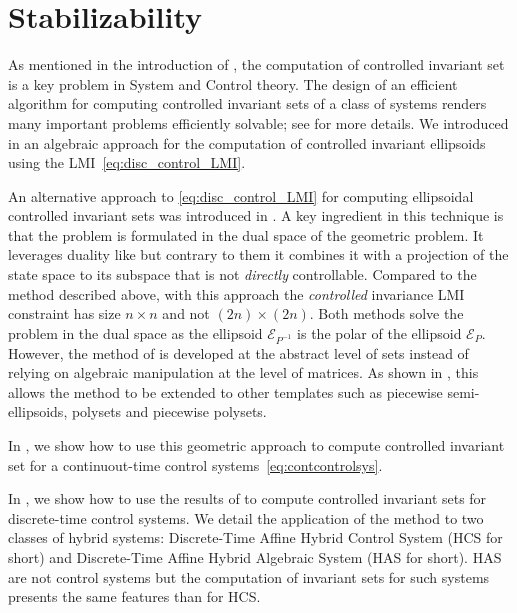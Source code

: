 \documentclass[11pt,twoside,a4paper,openright]{uclouvain-thesis}
\newcommand{\dtahcs}{HCS}
\newcommand{\dtahas}{HAS}
\begin{document}
\chapter{Stabilizability}
\label{chap:mci}

As mentioned in the introduction of ,
the computation of controlled invariant set is a key problem in System and Control theory.
The design of an efficient algorithm for computing controlled invariant sets
of a class of systems renders many important problems efficiently solvable; see \cite{blanchini1999survey} for more details.
We introduced in  an algebraic approach for the computation of
controlled invariant ellipsoids using the LMI~\eqref{eq:disc_control_LMI}.

An alternative approach to \eqref{eq:disc_control_LMI} for computing ellipsoidal
controlled invariant sets was introduced in \cite{legat2018computing, legat2020sum, legat2020piecewiseCO}. A key
ingredient in this technique is that the problem is formulated in the dual space
of the geometric problem. It leverages duality like
\cite{boyd1994linear, ahmadi2015robust} but contrary to them it combines it with
a projection of the state space to its subspace that is not \emph{directly} %
controllable.
Compared to the method described above, with this approach the \emph{controlled}
invariance LMI constraint has size $n \times n$ and not $(2n) \times (2n)$.
Both methods solve the problem in the dual space as the ellipsoid
$\mathcal{E}_{P^{-1}}$ is the polar of the ellipsoid $\mathcal{E}_{P}$.
However, the method of \cite{legat2018computing, legat2020sum, legat2020piecewiseCO} is developed at the abstract level of sets
instead of relying on algebraic manipulation at the level of matrices.
As shown in ,
this allows the method to be extended to other templates
such as piecewise semi-ellipsoids, polysets and piecewise polysets.

In , we show how to use this geometric approach
to compute controlled invariant set for a continuout-time control systems~\eqref{eq:contcontrolsys}.

In , we show how to use the results
of  to compute controlled invariant sets for discrete-time control systems.
We detail the application of the method to two classes of hybrid systems:
Discrete-Time Affine Hybrid Control System (\dtahcs{} for short) and Discrete-Time Affine Hybrid Algebraic System (\dtahas{} for short).
\dtahas{} are not control systems but the computation of invariant sets for such systems presents
the same features than for \dtahcs{}.
\end{document}
